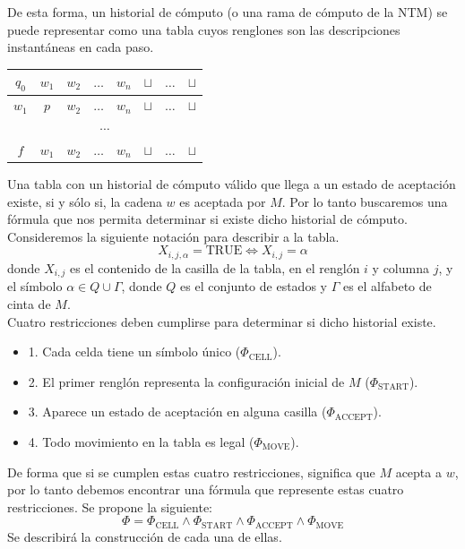 \documentclass[a4paper]{article}
\begin{document}
De esta forma, un historial de cómputo (o una rama de cómputo de la NTM) se puede representar como una tabla cuyos renglones son las descripciones instantáneas en cada paso.\\
\begin{table}[h]
  \begin{center}
    \begin{tabular}{| c | c | c | C{2cm} | c | c | C{4cm} | c |}
      \hline
      $q_0$ & $w_1$ & $w_2$ & $\dots$ & $w_n$ & $\sqcup$ & $\dots$ & $\sqcup$\\
      \hline
      $w_1$ & $p$ & $w_2$ & $\dots$ & $w_n$ & $\sqcup$ & $\dots$ & $\sqcup$\\
      \hline
      \\
      \hline
      $f$ & $w_1$ & $w_2$ & $\dots$ & $w_n$ & $\sqcup$ & $\dots$ & $\sqcup$\\
      \hline
    \end{tabular}
  \end{center}
\end{table}

Una tabla con un historial de cómputo válido que llega a un estado de aceptación existe, si y sólo si, la cadena $w$ es aceptada por $M$. Por lo tanto buscaremos una fórmula que nos permita determinar si existe dicho historial de cómputo.\\
Consideremos la siguiente notación para describir a la tabla.
$$X_{i,j,\alpha} = \text{TRUE} \iff X_{i,j} = \alpha$$
donde $X_{i,j}$ es el contenido de la casilla de la tabla, en el renglón $i$ y columna $j$, y el símbolo $\alpha \in Q\cup\Gamma$, donde $Q$ es el conjunto de estados y $\Gamma$ es el alfabeto de cinta de $M$.\\

Cuatro restricciones deben cumplirse para determinar si dicho historial existe.

\begin{itemize}
  \item 1. Cada celda tiene un símbolo único ($\Phi_{\text{CELL}}$).
  \item 2. El primer renglón representa la configuración inicial de $M$ ($\Phi_{\text{START}}$).
  \item 3. Aparece un estado de aceptación en alguna casilla ($\Phi_{\text{ACCEPT}}$).
  \item 4. Todo movimiento en la tabla es legal ($\Phi_{\text{MOVE}}$).
\end{itemize}

De forma que si se cumplen estas cuatro restricciones, significa que $M$ acepta a $w$, por lo tanto debemos encontrar una fórmula que represente estas cuatro restricciones.
Se propone la siguiente:
$$\Phi = \Phi_{\text{CELL}} \land \Phi_{\text{START}} \land \Phi_{\text{ACCEPT}} \land \Phi_{\text{MOVE}}$$
Se describirá la construcción de cada una de ellas.
\end{document}

